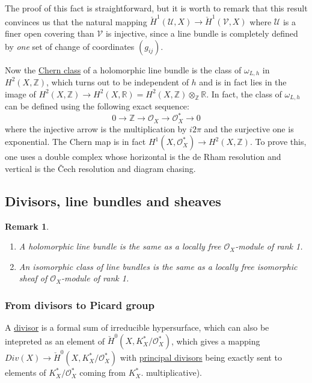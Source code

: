 \documentclass[11pt]{article}
\newtheorem{remark}{Remark}
\begin{document}
The proof of this fact is straightforward, but it is worth to remark that this result
convinces us that the natural mapping \(\check{H}^1(\mathcal{U},X) \longrightarrow
\check{H}^1(\mathcal{V},X)\) where \(\mathcal{U}\) is a finer open covering than \(\mathcal{V}\) is injective, since a line bundle is completely defined by \emph{one} set of
change of coordinates \((g_{ij})\).

Now the \uline{Chern class} of a holomorphic line bundle is the class of \(\omega_{L,h}\) in
\(H^2(X,\mathbb{Z})\), which turns out to be independent of \(h\) and is in fact lies
in the image of \(H^2(X,\mathbb{Z}) \longrightarrow H^2(X,\mathbb{R}) = H^2(X, \mathbb{Z})\otimes_{\mathbb{Z}}\mathbb{R}\). In fact, the class
of \(\omega_{L,h}\) can be defined using the following exact sequence:
\[
0 \longrightarrow \mathbb{Z} \longrightarrow \mathcal{O}_X \longrightarrow \mathcal{O}_X^* \longrightarrow 0 
\]
where the injective arrow is the multiplication by \(i2\pi\) and the surjective one is
exponential. The Chern map is in fact \(H^1(X,\mathcal{O}^*_X) \longrightarrow
H^2(X,\mathbb{Z})\). To prove this, one uses a double complex whose horizontal is the de Rham
resolution and vertical is the Čech resolution and diagram chasing.




\subsection{Divisors, line bundles and sheaves}
\label{sec:org74a6f29}
\begin{remark}
\begin{enumerate}
\item A holomorphic line bundle is the same as a locally free \(\mathcal{O}_X\)-module of rank 1.
\item An isomorphic class of line bundles is the same as a locally free isomorphic sheaf of \(\mathcal{O}_X\)-module of rank 1.
\end{enumerate}
\end{remark}
\subsubsection{From divisors to Picard group}
\label{sec:org56d6d16}
A \uline{divisor} is a formal sum of irreducible hypersurface, which can also be intepreted as
an element of \(\check{H}^0(X,K_X^*/\mathcal{O}_X^*)\), which gives a mapping \(Div(X)
\longrightarrow \check{H}^0(X,K_X^*/\mathcal{O}_X^*)\) with \uline{principal divisors} being
exactly sent to elements of \(K_X^*/\mathcal{O}_X^*\) coming from \(K_X^*\).
multiplicative).
\end{document}
